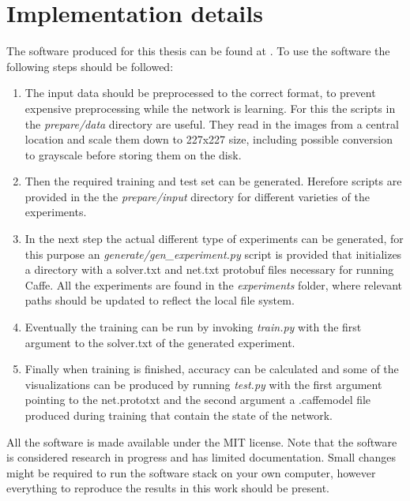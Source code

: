 %
\chapter{Implementation details}
\label{app:implementation_details}

The software produced for this thesis can be found at \needref. To use the software the following steps should be followed:
\begin{enumerate}
\item The input data should be preprocessed to the correct format, to prevent expensive preprocessing while the network is learning. For this the scripts in the \textit{prepare/data} directory are useful. They read in the images from a central location and scale them down to 227x227 size, including possible conversion to grayscale before storing them on the disk.
\item Then the required training and test set can be generated. Herefore scripts are provided in the the \textit{prepare/input} directory for different varieties of the experiments.
\item In the next step the actual different type of experiments can be generated, for this purpose an \textit{generate/gen\_experiment.py} script is provided that initializes a directory with a solver.txt and net.txt protobuf files necessary for running Caffe. All the experiments are found in the \textit{experiments} folder, where relevant paths should be updated to reflect the local file system.
\item Eventually the training can be run by invoking \textit{train.py} with the first argument to the solver.txt of the generated experiment. 
\item Finally when training is finished, accuracy can be calculated and some of the visualizations can be produced by running \textit{test.py} with the first argument pointing to the net.prototxt and the second argument a .caffemodel file produced during training that contain the state of the network.
\end{enumerate}
All the software is made available under the MIT license. Note that the software is considered research in progress and has limited documentation. Small changes might be required to run the software stack on your own computer, however everything to reproduce the results in this work should be present.
